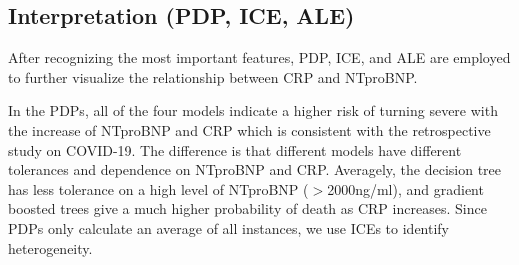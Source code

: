 \subsection{Interpretation (PDP, ICE, ALE)}

After recognizing the most important features, PDP, ICE, and ALE are employed to further visualize the relationship between CRP and NTproBNP.

In the PDPs, all of the four models indicate a higher risk of turning severe with the increase of NTproBNP and CRP which is consistent with the retrospective study on COVID-19. The difference is that different models have different tolerances and dependence on NTproBNP and CRP. Averagely, the decision tree has less tolerance on a high level of NTproBNP ($>$2000ng/ml), and gradient boosted trees give a much higher probability of death as CRP increases. Since PDPs only calculate an average of all instances, we use ICEs to identify heterogeneity.

